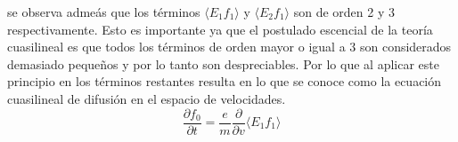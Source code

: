 \documentclass[../tesis_main_file.tex]{subfiles}
\begin{document}
se observa admeás que los términos $ \langle E_1 f_1 \rangle $ y $ \langle E_2 f_1 \rangle $ son de orden 2 y 3 respectivamente. Esto es importante ya que el postulado escencial de la teoría cuasilineal es que todos los términos de orden mayor o igual a 3 son considerados demasiado pequeños y por lo tanto son despreciables. Por lo que al aplicar este principio en los términos restantes resulta en lo que se conoce como la ecuación cuasilineal de difusión en el espacio de velocidades.
\begin{equation}
\label{eq:ec_cuasilienal_difusion}
\frac{\partial f_0}{\partial t}=\frac{e}{m}\frac{\partial}{\partial v}\langle E_1 f_1 \rangle
\end{equation}
\onlyinsubfile{}
\onlyinsubfile{}
\end{document}
